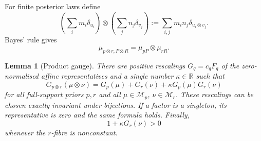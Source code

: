 \documentclass[11pt,a4paper]{article}
\newtheorem{lemma}[theorem]{Lemma}
\theoremstyle{definition}
\newcommand{\1}{\mathbf 1}
\begin{document}
For finite posterior laws define
\[
 \left(\sum_i m_i\delta_{u_i}\right)\otimes
 \left(\sum_j n_j\delta_{v_j}\right)
 :=\sum_{i,j}m_i n_j\delta_{u_i\otimes v_j}.
\]
Bayes' rule gives
\begin{equation}
 \mu_{p\otimes r,P\otimes R}=\mu_{pP}\otimes\mu_{rR}.
\tag{PL}\label{pt:eq:productlaw}
\end{equation}

\begin{lemma}[Product gauge]
\label{pt:lem:coherentnorm}\label{pt:cor:permutationinvariance}
There are positive rescalings $G_q=c_qF_q$ of the zero-normalised affine
representatives and a single number $\kappa\in\mathbb R$ such that
\begin{equation}
 G_{p\otimes r}(\mu\otimes\nu)
 =G_p(\mu)+G_r(\nu)+\kappa G_p(\mu)G_r(\nu)
\tag{QA}\label{pt:eq:QA}
\end{equation}
for all full-support priors $p,r$ and all
$\mu\in\mathcal M_p$, $\nu\in\mathcal M_r$.  These rescalings can be chosen
exactly invariant under bijections.  If a factor is a singleton, its
representative is zero and the same formula holds.  Finally,
\begin{equation}
 1+\kappa G_r(\nu)>0
\tag{POS}\label{pt:eq:QAslope}
\end{equation}
whenever the $r$-fibre is nonconstant.
\end{lemma}
\end{document}
